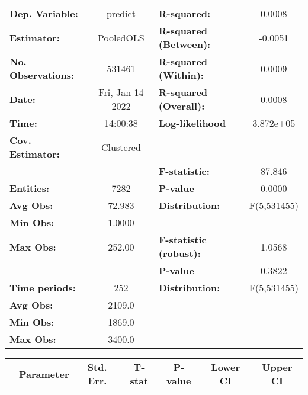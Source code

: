 \begin{center}
\begin{tabular}{lclc}
\toprule
\textbf{Dep. Variable:}    &      predict       & \textbf{  R-squared:         }   &      0.0008      \\
\textbf{Estimator:}        &     PooledOLS      & \textbf{  R-squared (Between):}  &     -0.0051      \\
\textbf{No. Observations:} &       531461       & \textbf{  R-squared (Within):}   &      0.0009      \\
\textbf{Date:}             &  Fri, Jan 14 2022  & \textbf{  R-squared (Overall):}  &      0.0008      \\
\textbf{Time:}             &      14:00:38      & \textbf{  Log-likelihood     }   &    3.872e+05     \\
\textbf{Cov. Estimator:}   &     Clustered      & \textbf{                     }   &                  \\
\textbf{}                  &                    & \textbf{  F-statistic:       }   &      87.846      \\
\textbf{Entities:}         &        7282        & \textbf{  P-value            }   &      0.0000      \\
\textbf{Avg Obs:}          &       72.983       & \textbf{  Distribution:      }   &   F(5,531455)    \\
\textbf{Min Obs:}          &       1.0000       & \textbf{                     }   &                  \\
\textbf{Max Obs:}          &       252.00       & \textbf{  F-statistic (robust):} &      1.0568      \\
\textbf{}                  &                    & \textbf{  P-value            }   &      0.3822      \\
\textbf{Time periods:}     &        252         & \textbf{  Distribution:      }   &   F(5,531455)    \\
\textbf{Avg Obs:}          &       2109.0       & \textbf{                     }   &                  \\
\textbf{Min Obs:}          &       1869.0       & \textbf{                     }   &                  \\
\textbf{Max Obs:}          &       3400.0       & \textbf{                     }   &                  \\
\bottomrule
\end{tabular}
\begin{tabular}{lcccccc}
                & \textbf{Parameter} & \textbf{Std. Err.} & \textbf{T-stat} & \textbf{P-value} & \textbf{Lower CI} & \textbf{Upper CI}  \\

\end{tabular}
\end{center}
